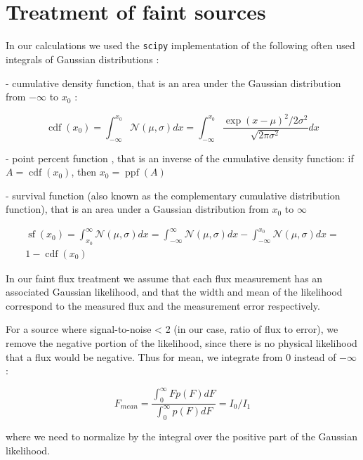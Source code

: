 \documentclass[fleqn,usenatbib]{mnras}  %
\DeclareMathOperator\cdf{cdf}
\DeclareMathOperator\sf{sf}
\DeclareMathOperator\ppf{ppf}
\begin{document}
\appendix
\section{\\ Treatment of faint sources}
\label{App:AppendixA}

In our calculations we used the  \verb|scipy| implementation of 
the following often used integrals of Gaussian distributions : 

- cumulative density function, that is an area under the Gaussian distribution from $-\infty$ to $x_{0}$ :

\begin{equation}
\cdf(x_{0}) = \int_{-\infty}^{x_{0}}{\mathcal{N}(\mu,\sigma)dx} = \int_{-\infty}^{x_{0}}{\frac{\exp{(x-\mu)^{2} / 2\sigma^{2}}}{\sqrt{2\pi\sigma^{2}}} dx}
\end{equation}

- point percent function , that is an inverse of the cumulative density function:  if  $A = \cdf(x_{0})$, then  $x_{0} = \ppf(A)$

- survival function (also known  as the complementary cumulative distribution function), that is an area under a Gaussian distribution from $x_{0}$ to $\infty$

\begin{multline}
\sf(x_{0}) =  \int_{x_{0}}^{\infty}{\mathcal{N}(\mu,\sigma)dx} =  \int_{-\infty}^{\infty}{\mathcal{N}(\mu,\sigma)dx} -  \int_{-\infty}^{x_{0}}{\mathcal{N}(\mu,\sigma)dx} = \\
1 - \cdf(x_{0})
\end{multline}

In our faint flux treatment  we assume that each flux measurement has an associated Gaussian likelihood, and that the width and mean of the likelihood correspond 
to the measured flux and the measurement error respectively. 

For a source where signal-to-noise < 2 (in our case, ratio of  flux to error), we remove the negative portion of the likelihood, since there is no physical likelihood that a flux would be negative.
Thus for mean, we integrate from $0$ instead of $-\infty$ : 


\begin{equation}
F_{mean} = \frac{\int _{0} ^ {\infty}{F p(F) dF}}{\int _{0} ^ {\infty}{p(F) dF}} = I_{0} / I_{1}
\end{equation}

where we need to normalize by the integral over the positive part of the Gaussian likelihood. 
\end{document}
